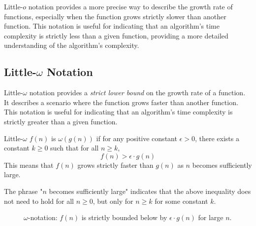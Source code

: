 Little-$o$ notation provides a more precise way to describe the growth rate of functions, especially when the function grows strictly slower than another function. This notation is useful for indicating that an algorithm's time complexity is strictly less than a given function, providing a more detailed understanding of the algorithm's complexity.

\subsection*{Little-\texorpdfstring{$\omega$}{omega} Notation}
Little-$\omega$ notation provides a \textit{strict lower bound} on the growth rate of a function. It describes a scenario where the function grows faster than another function. This notation is useful for indicating that an algorithm's time complexity is strictly greater than a given function.

\begin{definition}{Little-$\omega$}\label{def:little_omega_notation}
    $f(n)$ is $\omega(g(n))$ if for any positive constant $\epsilon > 0$, there exists a constant $k \geq 0$ such that for all $n \geq k$,
    \medskip
    \[
    f(n) > \epsilon \cdot g(n)
    \]
    \medskip
    This means that $f(n)$ grows strictly faster than $g(n)$ as $n$ becomes sufficiently large.
\end{definition}

The phrase "$n$ becomes sufficiently large" indicates that the above inequality does not need to hold for all $n \geq 0$, but only for $n \geq k$ for some constant $k$.

\begin{figure}[htbp]
    \centering
    \caption{$\omega$-notation: $f(n)$ is strictly bounded below by $\epsilon \cdot g(n)$ for large $n$.}
    \label{fig:little_omega_notation}
\end{figure}

